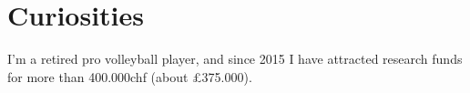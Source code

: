 \documentclass[]{plushcv}
\begin{document}
\begin{minipage}[t]{0.25\textwidth}



\section{Curiosities}
I'm a retired pro volleyball player, and since 2015 I have attracted research funds for more than 400.000chf (about £375.000).






\end{minipage} 
\end{document}
